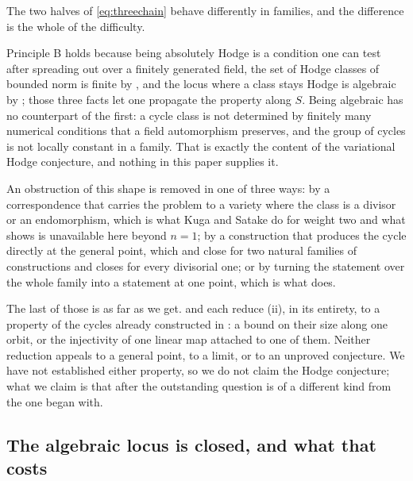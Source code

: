 \begin{remark}
\label{rem:whyterminal}
The two halves of \eqref{eq:threechain} behave differently in families, and
the difference is the whole of the difficulty.

Principle B holds because being absolutely Hodge is a condition one can test
after spreading out over a finitely generated field, the set of Hodge classes
of bounded norm is finite by , and the locus where a
class stays Hodge is algebraic by ; those three facts let one
propagate the property along $S$. Being algebraic has no counterpart of the
first: a cycle class is not determined by finitely many numerical conditions
that a field automorphism preserves, and the group of cycles is not locally
constant in a family. That is exactly the content of the variational Hodge
conjecture, and nothing in this paper supplies it.

An obstruction of this shape is removed in one of three ways: by a correspondence that carries the problem to a variety where
the class is a divisor or an endomorphism, which is what Kuga and Satake do
for weight two and what  shows is unavailable here beyond
$n=1$; by a construction that produces the cycle directly at the general
point, which  and  close for two natural
families of constructions and  closes for every divisorial
one; or by turning the statement over the whole family into a statement at one
point, which is what  does.

The last of those is as far as we get.  and
 each reduce (ii), in its
entirety, to a property of the cycles already constructed in
: a bound on their size along one orbit, or the
injectivity of one linear map attached to one of them. Neither reduction
appeals to a general point, to a limit, or to an unproved conjecture. We have
not established either property, so we do not claim the Hodge conjecture; what
we claim is that after  the outstanding question is of a
different kind from the one  began with.
\end{remark}

\subsection{The algebraic locus is closed, and what that costs}
\label{ssec:properness}

